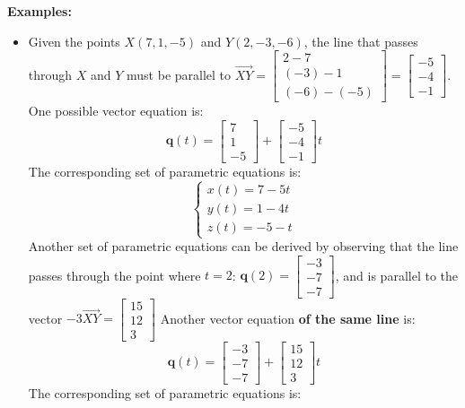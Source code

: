 \documentclass{article}
\begin{document}
\textbf{Examples:}
\begin{itemize}
\item Given the points \(X(7, 1, -5)\) and \(Y(2, -3, -6)\), the line that passes through \(X\) and \(Y\) must be parallel to \(\overrightarrow{XY} = \begin{bmatrix} 2 - 7 \\ (-3) - 1 \\ (-6) - (-5) \end{bmatrix} = \begin{bmatrix} -5 \\ -4 \\ -1 \end{bmatrix}\). One possible vector equation is:
\[\mathbf{q}(t) = \begin{bmatrix} 7 \\ 1 \\ -5 \end{bmatrix} + \begin{bmatrix} -5 \\ -4 \\ -1 \end{bmatrix}t\] 
The corresponding set of parametric equations is: 
\[\left\{\begin{array}{c} x(t) = 7 - 5t \\ y(t) = 1 - 4t \\ z(t) = -5 - t \end{array}\right.\]
Another set of parametric equations can be derived by observing that the line passes through the point where \(t = 2\): \(\mathbf{q}(2) = \begin{bmatrix} -3 \\ -7 \\ -7 \end{bmatrix}\), and is parallel to the vector \(-3\overrightarrow{XY} = \begin{bmatrix} 15 \\ 12 \\ 3 \end{bmatrix}\) Another vector equation {\bf of the same line} is: 
\[\mathbf{q}(t) = \begin{bmatrix} -3 \\ -7 \\ -7 \end{bmatrix} + \begin{bmatrix} 15 \\ 12 \\ 3 \end{bmatrix}t\] 
The corresponding set of parametric equations is: 

\end{itemize}
\end{document}

